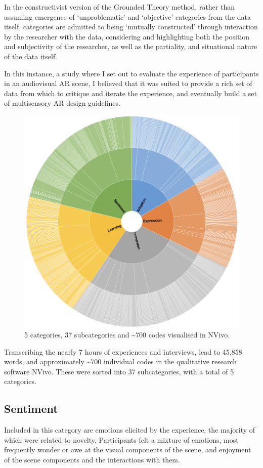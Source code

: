 In the constructivist version of the Grounded Theory method, rather than assuming emergence of ‘unproblematic’ and ‘objective’ categories from the data itself, categories are admitted to being ‘mutually constructed’ through interaction by the researcher with the data, considering and highlighting both the position and subjectivity of the researcher, as well as the partiality, and situational nature of the data itself.

In this instance, a study where I set out to evaluate the experience of participants in an audiovisual AR scene, I believed that it was suited to provide a rich set of data from which to critique and iterate the experience, and eventually build a set of multisensory AR design guidelines.

\begin{figure}
    \centering
    \includegraphics[width=0.7\linewidth]{figures/06-polaris/polaris-feedback-grounded-codes.png}
    \caption{5 categories, 37 subcategories and \textasciitilde{}700 codes visualised in NVivo.}
    \label{fig: polaris-feedback-grounded-codes}
\end{figure}

Transcribing the nearly 7 hours of experiences and interviews, lead to 45,858 words, and approximately \textasciitilde{}700 individual codes in the qualitative research software NVivo. These were sorted into 37 subcategories, with a total of 5 categories.

\subsection{Sentiment}\label{sec: polaris-feedback-sentiment}
Included in this category are emotions elicited by the experience, the majority of which were related to novelty. Participants felt a mixture of emotions, most frequently wonder or awe at the visual components of the scene, and enjoyment of the scene components and the interactions with them.

